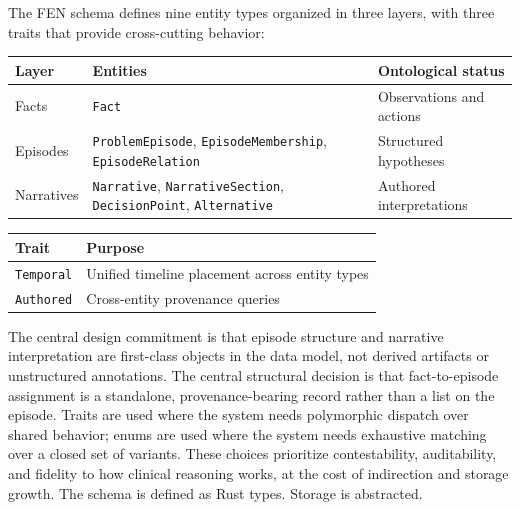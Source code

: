 \documentclass[11pt]{article}
\begin{document}
The FEN schema defines nine entity types organized in three layers, with
three traits that provide cross-cutting behavior:

\begin{center}
\renewcommand{\arraystretch}{1.3}
\begin{tabular}{l l l}
\textbf{Layer} & \textbf{Entities} & \textbf{Ontological status} \\
\hline
Facts      & \texttt{Fact}
           & Observations and actions \\
Episodes   & \texttt{ProblemEpisode}, \texttt{EpisodeMembership}, \texttt{EpisodeRelation}
           & Structured hypotheses \\
Narratives & \texttt{Narrative}, \texttt{NarrativeSection}, \texttt{DecisionPoint}, \texttt{Alternative}
           & Authored interpretations \\
\end{tabular}
\end{center}

\begin{center}
\renewcommand{\arraystretch}{1.3}
\begin{tabular}{l l}
\textbf{Trait} & \textbf{Purpose} \\
\hline
\texttt{Temporal}    & Unified timeline placement across entity types \\
\texttt{Authored}    & Cross-entity provenance queries \\
\end{tabular}
\end{center}

The central design commitment is that episode structure and narrative
interpretation are first-class objects in the data model, not derived
artifacts or unstructured annotations. The central structural decision is
that fact-to-episode assignment is a standalone, provenance-bearing record
rather than a list on the episode. Traits are used where the system needs
polymorphic dispatch over shared behavior; enums are used where the system
needs exhaustive matching over a closed set of variants. These choices
prioritize contestability, auditability, and fidelity to how clinical
reasoning works, at the cost of indirection and storage growth. The schema
is defined as Rust types. Storage is abstracted.
\end{document}
